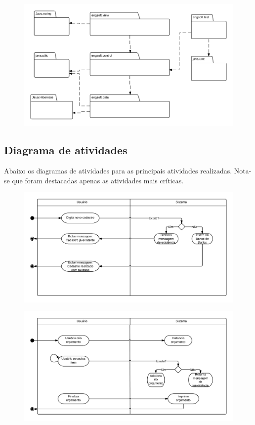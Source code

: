 \documentclass[a4paper,10pt]{article}
\begin{document}
\begin{figure}[H]
\centering
\includegraphics[width=1\textwidth]{pic/pacotes.png}
\end{figure}

\subsection{Diagrama de atividades}

Abaixo os diagramas de atividades para as principais atividades realizadas. Nota-se que foram destacadas apenas as atividades mais críticas.

\begin{figure}[H]
\centering
\includegraphics[width=1\textwidth]{pic/atividades_1.png}
\end{figure}

\begin{figure}[H]
\centering
\includegraphics[width=1\textwidth]{pic/atividades_2.png}
\end{figure}
\end{document}
